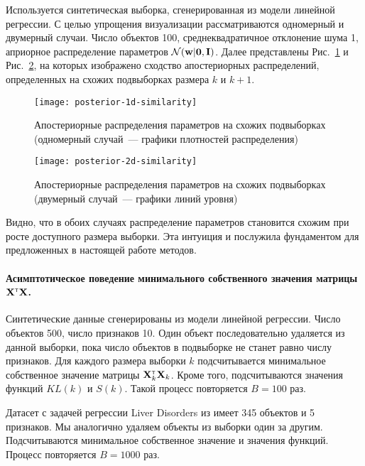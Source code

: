 Используется синтетическая выборка, сгенерированная из модели линейной регрессии. С целью упрощения визуализации рассматриваются одномерный и двумерный случаи. Число объектов 100, среднеквадратичное отклонение шума 1, априорное распределение параметров $\mathcal{N}(\mathbf{w} | \mathbf{0}, \mathbf{I})$. Далее представлены Рис.~\ref{posterior-1d-similarity} и Рис.~\ref{posterior-2d-similarity}, на которых изображено сходство апостериорных распределений, определенных на схожих подвыборках размера $k$ и $k+1$.

\begin{figure}[h!]
    \centering
    \texttt{[image: posterior-1d-similarity]}
    \caption{Апостериорные распределения параметров на схожих подвыборках (одномерный случай~--- графики плотностей распределения)}
    \label{posterior-1d-similarity}
\end{figure}

\begin{figure}[h!]
    \centering
    \texttt{[image: posterior-2d-similarity]}
    \caption{Апостериорные распределения параметров на схожих подвыборках (двумерный случай~--- графики линий уровня)}
    \label{posterior-2d-similarity}
\end{figure}

Видно, что в обоих случаях распределение параметров становится схожим при росте доступного размера выборки. Эта интуиция и послужила фундаментом для предложенных в настоящей работе методов.

\paragraph{Асимптотическое поведение минимального собственного значения матрицы $\mathbf{X}^{\text{\tiny\sffamily\upshape\mdseries T}}\mathbf{X}$.}

Синтетические данные сгенерированы из модели линейной регрессии. Число объектов 500, число признаков 10. Один объект последовательно удаляется из данной выборки, пока число объектов в подвыборке не станет равно числу признаков. Для каждого размера выборки $k$ подсчитывается минимальное собственное значение матрицы $\mathbf{X}_k^{\text{\tiny\sffamily\upshape\mdseries T}} \mathbf{X}_k$. Кроме того, подсчитываются значения функций $KL(k)$ и $S(k)$. Такой процесс повторяется $B=100$ раз.

Датасет с задачей регрессии Liver Disorders из \cite{UCI} имеет 345 объектов и 5 признаков. Мы аналогично удаляем объекты из выборки один за другим. Подсчитываются минимальное собственное значение и значения функций. Процесс повторяется $B=1000$ раз.

